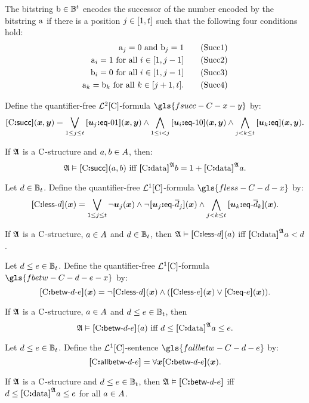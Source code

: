 The bitstring $\mathrm{b} \in \mathbb{B}^{t}$ encodes the successor of the number
encoded by the bitstring $\mathrm{a}$ if there is a position $j \in [1,t]$
such that the following four conditions hold:
\begin{align}
  \mathrm{a}_j = 0 \text{ and } \mathrm{b}_j = 1 \tag{Succ1}\label{Succ1} \\
  \mathrm{a}_i = 1 \text{ for all } i \in [1,j-1] \tag{Succ2}\label{Succ2} \\
  \mathrm{b}_i = 0 \text{ for all } i \in [1,j-1] \tag{Succ3}\label{Succ3} \\
  \mathrm{a}_k = \mathrm{b}_k \text{ for all } k \in [j+1,t].
  \tag{Succ4}\label{Succ4}
\end{align}
\begin{definition}
Define the quantifier-free $\mathcal{L}^{2}[{\mathrm{C}}]$-formula $\gls{fsucc-C-x-y}$ by:
\[
  {\bm{[}{\mathrm{C}}\mathord{\bm{:}}\mathsf{succ}\bm{]}}(\bm{x},\bm{y}) = \bigvee_{1 \leq j \leq t}
  {\bm{[}\bm{u}_{j}\mathord{\bm{:}}\mathsf{eq}{\hbox{-}}01\bm{]}}(\bm{x},\bm{y}) \land 
  \bigwedge_{1 \leq i < j} 
  {\bm{[}\bm{u}_{i}\mathord{\bm{:}}\mathsf{eq}{\hbox{-}}10\bm{]}}(\bm{x},\bm{y}) \land
  \bigwedge_{j < k \leq t} {\bm{[}\bm{u}_{k}\mathord{\bm{:}}\mathsf{eq}\bm{]}}(\bm{x},\bm{y}).
\]
\end{definition}
If $\mathfrak{A}$ is a ${\mathrm{C}}$-structure and $a, b \in A$,
then:
\[
  \miff{
  \StrA \vDash \fsucc\CS(\ea, \eb)}{
  \data\CS\StrA\eb = 1 + \data\CS\StrA\ea}.
\]

\begin{definition}
Let $d \in \mathbb{B}_{t}$.
Define the quantifier-free $\mathcal{L}^{1}[{\mathrm{C}}]$-formula $\gls{fless-C-d-x}$ by:
\[
  {\bm{[}{\mathrm{C}}\mathord{\bm{:}}\mathsf{less}{\hbox{-}}d\bm{]}}(\bm{x}) = \bigvee_{1 \leq j \leq t} \lnot\bm{u}_{j}(\bm{x})
  \land \lnot{\bm{[}\bm{u}_{j}\mathord{\bm{:}}\mathsf{eq}{\hbox{-}}\overline{d}_j\bm{]}}(\bm{x})
    \land \bigwedge_{j < k \leq t} {\bm{[}\bm{u}_{k}\mathord{\bm{:}}\mathsf{eq}{\hbox{-}}\overline{d}_k\bm{]}}(\bm{x}).
\]
\end{definition}
If $\mathfrak{A}$ is a ${\mathrm{C}}$-structure, $a \in A$ and $d \in
\mathbb{B}_{t}$, then $\mathfrak{A} \vDash {\bm{[}{\mathrm{C}}\mathord{\bm{:}}\mathsf{less}{\hbox{-}}d\bm{]}}(a)$ iff ${\bm{[}{\mathrm{C}}\mathord{\bm{:}}\mathrm{data}\bm{]}}^{\mathfrak{A}}a
< d$.

\begin{definition}
Let $d \leq e \in \mathbb{B}_{t}$.
Define the quantifier-free $\mathcal{L}^{1}[{\mathrm{C}}]$-formula $\gls{fbetw-C-d-e-x}$ by:
\[
  {\bm{[}{\mathrm{C}}\mathord{\bm{:}}\mathsf{betw}{\hbox{-}}d{\hbox{-}}e\bm{]}}(\bm{x}) = \lnot{\bm{[}{\mathrm{C}}\mathord{\bm{:}}\mathsf{less}{\hbox{-}}d\bm{]}}(\bm{x}) \land 
  ({\bm{[}{\mathrm{C}}\mathord{\bm{:}}\mathsf{less}{\hbox{-}}e\bm{]}}(\bm{x})\lor {\bm{[}{\mathrm{C}}\mathord{\bm{:}}\mathsf{eq}{\hbox{-}}e\bm{]}}(\bm{x})).
\]
\end{definition}
If $\mathfrak{A}$ is a ${\mathrm{C}}$-structure, $a \in A$ and $d \leq e \in
\mathbb{B}_{t}$, then 
\[
  \miff{
  \StrA \vDash \fbetw\CS\datad\datae(\ea)}{
  \datad \leq \data\CS\StrA\ea \leq
  \datae}.
\]

\begin{definition}
Let $d \leq e \in \mathbb{B}_{t}$.
Define the $\mathcal{L}^{1}[{\mathrm{C}}]$-sentence $\gls{fallbetw-C-d-e}$ by:
\[
  {\bm{[}{\mathrm{C}}\mathord{\bm{:}}\mathsf{allbetw}{\hbox{-}}d{\hbox{-}}e\bm{]}} = \forall\bm{x}{\bm{[}{\mathrm{C}}\mathord{\bm{:}}\mathsf{betw}{\hbox{-}}d{\hbox{-}}e\bm{]}}(\bm{x}).
\]
\end{definition}
If $\mathfrak{A}$ is a ${\mathrm{C}}$-structure and $d \leq e \in \mathbb{B}_{t}$,
then $\mathfrak{A} \vDash {\bm{[}{\mathrm{C}}\mathord{\bm{:}}\mathsf{betw}{\hbox{-}}d{\hbox{-}}e\bm{]}}$ iff
$d \leq {\bm{[}{\mathrm{C}}\mathord{\bm{:}}\mathrm{data}\bm{]}}^{\mathfrak{A}}a \leq e$ for all $a \in A$.